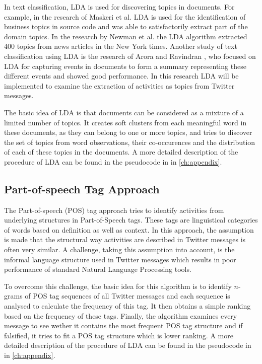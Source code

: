 In text classification, LDA is used for discovering topics in documents. For example, in the research of Maskeri et al. \cite{Maskeri} LDA is used for the identification of business topics in source code and was able to satisfactorily extract part of the domain topics. In the research by Newman et al. \cite{Newman} the LDA algorithm extracted 400 topics from news articles in the New York times. Another study of text classification using LDA is the research of Arora and Ravindran \cite{arora}, who focused on LDA for capturing events in documents to form a summary representing these different events and showed good performance. In this research LDA will be implemented to examine the extraction of activities as topics from Twitter messages.

The basic idea of LDA is that documents can be considered as a mixture of a limited number of topics. It creates soft clusters from each meaningful word in these documents, as they can belong to one or more topics, and tries to discover the set of topics from word observations, their co-occurences and the distribution of each of these topics in the documents. A more detailed description of the procedure of LDA can be found in the pseudocode in  in \autoref{ch:appendix}.

\subsection{Part-of-speech Tag Approach}
The Part-of-speech (POS) tag approach tries to identify activities from underlying structures in Part-of-Speech tags. These tags are linguistical categories of words based on definition as well as context. In this approach, the assumption is made that the structural way activities are described in Twitter messages is often very similar. A challenge, taking this assumption into account, is the informal language structure used in Twitter messages which results in poor performance of standard Natural Language Processing tools.

To overcome this challenge, the basic idea for this algorithm is to identify $n$-grams of POS tag sequences of all Twitter messages and each sequence is analysed to calculate the frequency of this tag. It then obtains a simple ranking based on the frequency of these tags. Finally, the algorithm examines every message to see wether it contains the most frequent POS tag structure and if falsified, it tries to fit a POS tag structure which is lower ranking. A more detailed description of the procedure of LDA can be found in the pseudocode in  in \autoref{ch:appendix}.


